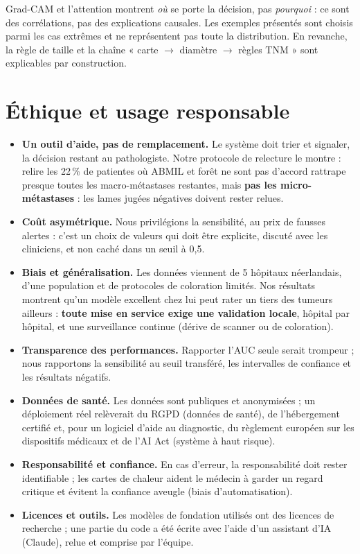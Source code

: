 \documentclass[11pt,a4paper]{article}
\begin{document}
\begin{limite}
Grad-CAM et l'attention montrent \emph{où} se porte la décision, pas \emph{pourquoi} : ce sont des corrélations, pas des explications
causales. Les exemples présentés sont choisis parmi les cas extrêmes et ne représentent pas toute la distribution. En revanche, la
règle de taille et la chaîne « carte $\to$ diamètre $\to$ règles TNM » sont explicables par construction.
\end{limite}

\section{Éthique et usage responsable}
\begin{itemize}
  \item \textbf{Un outil d'aide, pas de remplacement.} Le système doit trier et signaler, la décision restant au pathologiste. Notre
        protocole de relecture le montre : relire les 22\,\% de patientes où ABMIL et forêt ne sont pas d'accord rattrape presque toutes
        les macro-métastases restantes, mais \textbf{pas les micro-métastases} : les lames jugées négatives doivent rester relues.
  \item \textbf{Coût asymétrique.} Nous privilégions la sensibilité, au prix de fausses alertes : c'est un choix de valeurs qui doit être
        explicite, discuté avec les cliniciens, et non caché dans un seuil à 0,5.
  \item \textbf{Biais et généralisation.} Les données viennent de 5 hôpitaux néerlandais, d'une population et de protocoles de coloration
        limités. Nos résultats montrent qu'un modèle excellent chez lui peut rater un tiers des tumeurs ailleurs : \textbf{toute mise
        en service exige une validation locale}, hôpital par hôpital, et une surveillance continue (dérive de scanner ou de coloration).
  \item \textbf{Transparence des performances.} Rapporter l'AUC seule serait trompeur ; nous rapportons la sensibilité au seuil
        transféré, les intervalles de confiance et les résultats négatifs.
  \item \textbf{Données de santé.} Les données sont publiques et anonymisées ; un déploiement réel relèverait du RGPD (données de santé),
        de l'hébergement certifié et, pour un logiciel d'aide au diagnostic, du règlement européen sur les dispositifs médicaux et de
        l'AI Act (système à haut risque).
  \item \textbf{Responsabilité et confiance.} En cas d'erreur, la responsabilité doit rester identifiable ; les cartes de chaleur aident le
        médecin à garder un regard critique et évitent la confiance aveugle (biais d'automatisation).
  \item \textbf{Licences et outils.} Les modèles de fondation utilisés ont des licences de recherche ; une partie du code a été écrite avec
        l'aide d'un assistant d'IA (Claude), relue et comprise par l'équipe.
\end{itemize}
\end{document}
